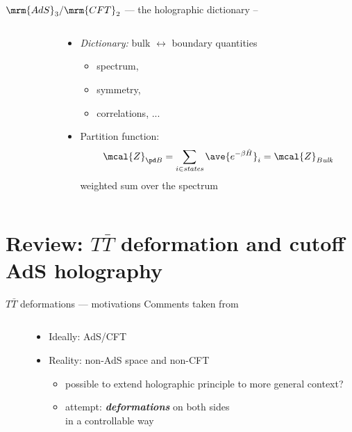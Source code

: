 \documentclass[aspectratio=169,10pt
	,noamsthm
]{beamer}
\newcommand{\TTbar}{\texorpdfstring{\ensuremath{T\bar{T}}}{TTbar}\xspace}
\begin{document}
\begin{frame}{$\mrm{AdS}_3/\mrm{CFT}_2$ --- the holographic dictionary}{%
	\textcite{Aharony:1999ti} -- 
}
\begin{columns}
\begin{column}{.4\textwidth}
\figAdsCft
\end{column}
\begin{column}{.6\textwidth}
	\begin{itemize}
	\item \textit{Dictionary:} bulk $\leftrightarrow$ boundary quantities
	
	\begin{itemize}
	\item spectrum,
	\item symmetry,
	\item correlations, ...
	\end{itemize}
	
	\item Partition function:
	\begin{equation}
		\mcal{Z}_{\pd B}
		= \sum_{i \in \textit{states}} \ave{e^{-\beta \hat{H}}}_i
		= \mcal{Z}_{B\textit{ulk}}
	\end{equation}
	weighted sum over the spectrum
	
	\end{itemize}
\end{column}
\end{columns}
\end{frame}

\section{\textbf{Review:} \TTbar deformation and cutoff AdS holography} \label{se:cutoffholography}

\begin{frame}{\TTbar deformations --- motivations}{%
	Comments taken from \textcite{Cui:2023jrb}
}
\begin{columns}
\begin{column}{.45\textwidth}
\figAdsCft
\end{column}
\begin{column}{.55\textwidth}
	\begin{itemize}
	\item Ideally: AdS/CFT
	\item Reality: non-AdS space and non-CFT
	\begin{itemize}
		\item possible to extend holographic principle to more general context?
		\item attempt: \textbf{\textit{deformations}} on both sides\\
		in a controllable way
	\end{itemize}
	\end{itemize}
\end{column}
\end{columns}
\end{frame}
\end{document}
